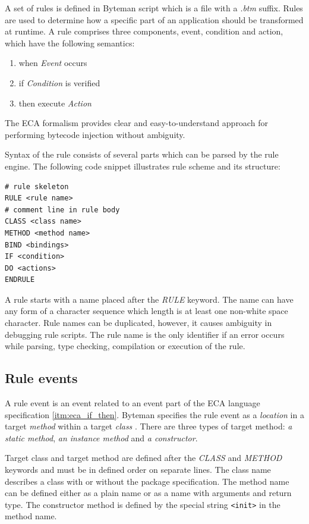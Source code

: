 \documentclass[12pt,oneside]{fithesis2}
\begin{document}
A set of rules is defined in Byteman script which is a file with a \textit{.btm} suffix. Rules are used to determine how a specific part of an application should be transformed at runtime. A rule comprises three components, event, condition and action, which have the following semantics\cite{eca}:

\begin{enumerate}
\label{itm:eca_if_then}
   \item when \textit{Event} occurs
   \item if \textit{Condition} is verified
   \item then execute \textit{Action}
\end{enumerate}

The ECA formalism provides clear and easy-to-understand approach for performing bytecode injection without ambiguity.

Syntax of the rule consists of several parts which can be parsed by the rule engine. The following code snippet illustrates rule scheme and its structure:

\begin{lstlisting}[caption = Byteman rule scheme \cite{byteman_doc}, label = byteman_scheme, style=byteman]
# rule skeleton
RULE <rule name>
# comment line in rule body
CLASS <class name>
METHOD <method name>
BIND <bindings>
IF <condition>
DO <actions>
ENDRULE
\end{lstlisting}

A rule starts with a name placed after the \textit{RULE} keyword. The name can have any form of a character sequence which length is at least one non-white space character. Rule names can be duplicated, however, it causes ambiguity in debugging rule scripts. The rule name is the only identifier if an error occurs while parsing, type checking, compilation or execution of the rule.

\subsection{Rule events}
\label{subsec:rule_events}
A rule event is an event related to an event part of the ECA language specification \ref{itm:eca_if_then}. Byteman specifies the rule event as a \textit{location} in a target \textit{method} within a target \textit{class} \cite[Rule Events]{byteman_doc}. There are three types of target method: \textit{a static method}, \textit{an instance method} and \textit{a constructor}.

Target class and target method are defined after the \textit{CLASS} and \textit{METHOD} keywords and must be in defined order on separate lines. The class name describes a class with or without the package specification. The method name can be defined either as a plain name or as a name with arguments and return type. The constructor method is defined by the special string \verb|<init>| in the method name.
\end{document}
